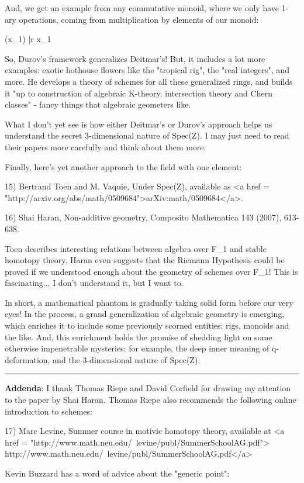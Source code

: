 And, we get an example from any commutative monoid, where we only
have 1-ary operations, coming from multiplication by elements of
our monoid:

(x_{1}) |\to  r x_{1}

So, Durov's framework generalizes Deitmar's!  But, it includes a lot
more examples: exotic hothouse flowers like the "tropical rig", the
"real integers", and more.  He develops a theory of schemes for all
these generalized rings, and builds it "up to construction of algebraic 
K-theory, intersection theory and Chern classes" - fancy things that
algebraic geometers like.

What I don't yet see is how either Deitmar's or Durov's approach
helps us understand the secret 3-dimensional nature of Spec(Z).  
I may just need to read their papers more carefully and think about
them more.

Finally, here's yet another approach to the field with one element:

15) Bertrand Toen and M. Vaquie, Under Spec(Z), available as 
<a href = "http://arxiv.org/abs/math/0509684">arXiv:math/0509684</a>.

16) Shai Haran, Non-additive geometry, Composito Mathematica 143
(2007), 613-638.  

Toen describes interesting relations between algebra over F_{1} and
stable homotopy theory.  Haran even suggests that the Riemann
Hypothesis could be proved if we understood enough about the geometry
of schemes over F_{1}!  This is fascinating... I don't understand it,
but I want to.

In short, a mathematical phantom is gradually taking solid form before our
very eyes!   In the process, a grand generalization of algebraic geometry
is emerging, which enriches it to include some previously scorned 
entities: rigs, monoids and the like.  And, this enrichment 
holds the promise of shedding light on some otherwise impenetrable
mysteries: for example, the deep inner meaning of 
q-deformation, and the 3-dimensional nature of Spec(Z).


\par\noindent\rule{\textwidth}{0.4pt}
\textbf{Addenda}: I thank Thomas Riepe and David Corfield for drawing my
attention to the paper by Shai Haran.  Thomas Riepe also recommends
the following online introduction to schemes:

17) Marc Levine, Summer course in motivic homotopy theory, available at 
<a href = "http://www.math.neu.edu/~levine/publ/SummerSchoolAG.pdf">
http://www.math.neu.edu/~levine/publ/SummerSchoolAG.pdf</a>

Kevin Buzzard has a word of advice about the "generic point":



